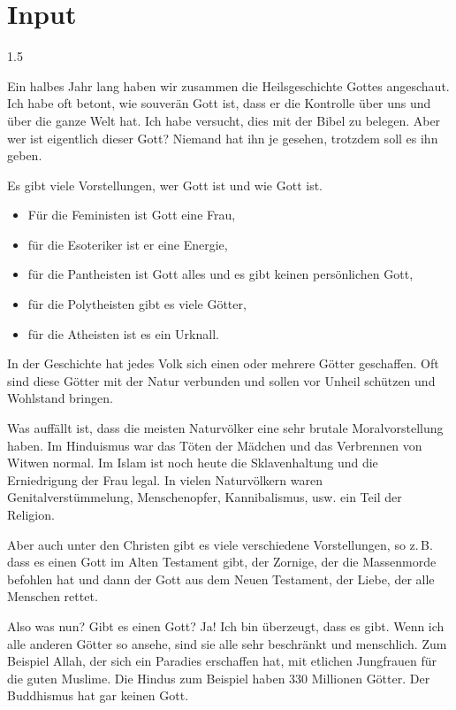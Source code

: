\documentclass[fontsize=14pt]{../../inc/mybib}
\begin{document}
\section{ Input }
\begin{spacing}{1.5}
    \begin{block}
        Ein halbes Jahr lang haben wir zusammen die Heilsgeschichte Gottes angeschaut. Ich habe oft betont, wie souverän Gott ist, dass er die Kontrolle über uns und über die ganze Welt hat. Ich habe versucht, dies mit der Bibel zu belegen. Aber wer ist eigentlich dieser Gott? Niemand hat ihn je gesehen, trotzdem soll es ihn geben.

        Es gibt viele Vorstellungen, wer Gott ist und wie Gott ist. 
        \begin{itemize}
            \item Für die Feministen ist Gott eine Frau, 
            \item für die Esoteriker ist er eine Energie,
            \item für die Pantheisten ist Gott alles und es gibt keinen persönlichen Gott,
            \item für die Polytheisten gibt es viele Götter,
            \item für die Atheisten ist es ein Urknall.
        \end{itemize}       

        In der Geschichte hat jedes Volk sich einen oder mehrere Götter geschaffen. Oft sind diese Götter mit der Natur verbunden und sollen vor Unheil schützen und Wohlstand bringen.

        Was auffällt ist, dass die meisten Naturvölker eine sehr brutale Moralvorstellung haben. Im Hinduismus war das Töten der Mädchen und das Verbrennen von Witwen normal. Im Islam ist noch heute die Sklavenhaltung und die Erniedrigung der Frau legal. In vielen Naturvölkern waren Genitalverstümmelung, Menschenopfer, Kannibalismus, usw. ein Teil der Religion.

        Aber auch unter den Christen gibt es viele verschiedene Vorstellungen, so z.\,B. dass es einen Gott im Alten Testament gibt, der Zornige, der die Massenmorde befohlen hat und dann der Gott aus dem Neuen Testament, der Liebe, der alle Menschen rettet.

        Also was nun? Gibt es  einen Gott? Ja! Ich bin überzeugt, dass es  gibt. Wenn ich alle anderen Götter so ansehe, sind sie alle sehr beschränkt und menschlich. Zum Beispiel Allah, der sich ein Paradies erschaffen hat, mit etlichen Jungfrauen für die guten Muslime. Die Hindus zum Beispiel haben 330 Millionen Götter. Der Buddhismus hat gar keinen Gott.


\end{block}
\end{spacing}
\end{document}
